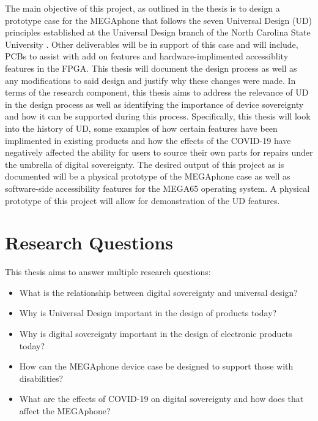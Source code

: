 The main objective of this project, as outlined in the thesis is to design a prototype case for the MEGAphone that follows the seven Universal Design (UD) principles established at the Universal Design branch of the North Carolina State University \cite{sevenprinciples}. 
Other deliverables will be in support of this case and will include, PCBs to assist with add on features and hardware-implimented accessiblity features in the FPGA.
This thesis will document the design process as well as any modifications to said design and justify why these changes were made.
In terms of the research component, this thesis aims to address the relevance of UD in the design process as well as identifying the importance of device sovereignty and how it can be supported during this process. 
Specifically, this thesis will look into the history of UD, some examples of how certain features have been implimented in existing products and how the effects of the COVID-19 have negatively affected the ability for users to source their own parts for repairs under the umbrella of digital sovereignty.
The desired output of this project as is documented will be a physical prototype of the MEGAphone case as well as software-side accessibility features for the MEGA65 operating system. 
A physical prototype of this project will allow for demonstration of the UD features.
 

\section{Research Questions}

This thesis aims to answer multiple research questions:

\begin{itemize} 
    \item What is the relationship between digital sovereignty and universal design?
    \item Why is Universal Design important in the design of products today?
    \item Why is digital sovereignty important in the design of electronic products today?
    \item How can the MEGAphone device case be designed to support those with disabilities?
    \item What are the effects of COVID-19 on digital sovereignty and how does that affect the MEGAphone?
    \end{itemize}

